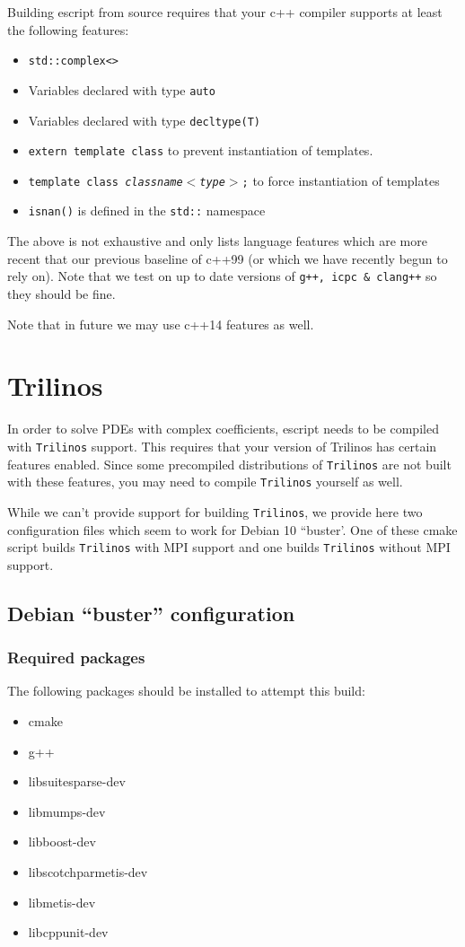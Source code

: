 \documentclass{esysdoc}
\begin{document}
Building escript from source requires that your c++ compiler supports at least the following features:
\begin{itemize}
 \item \texttt{std::complex<>}
 \item Variables declared with type \texttt{auto}
 \item Variables declared with type \texttt{decltype(T)}
 \item \texttt{extern template class} to prevent instantiation of templates.
 \item \texttt{template class \textit{classname$<$type$>$};} to force instantiation of templates
 \item \texttt{isnan()} is defined in the \texttt{std::} namespace
\end{itemize}
The above is not exhaustive and only lists language features which are more recent that our previous baseline of c++99 (or which
we have recently begun to rely on).
Note that we test on up to date versions of \texttt{g++, icpc \& clang++} so they should be fine.

Note that in future we may use c++14 features as well.

\chapter{Trilinos}
\label{app:trilinos}

In order to solve PDEs with complex coefficients, escript needs to be compiled with \texttt{Trilinos} support.
This requires that your version of Trilinos has certain features enabled.
Since some precompiled distributions of \texttt{Trilinos} are not built with these features, you may
need to compile \texttt{Trilinos} yourself as well.

While we can't provide support for building \texttt{Trilinos}, we provide here two configuration files which seem to work for
Debian 10 ``buster'. One of these cmake script builds \texttt{Trilinos} with MPI support and one builds \texttt{Trilinos} without MPI support.

\section{Debian ``buster'' configuration}


\subsection{Required packages}

The following packages should be installed to attempt this build:
\begin{itemize}
\item[] cmake
\item[] g++
\item[] libsuitesparse-dev
\item[] libmumps-dev
\item[] libboost-dev
\item[] libscotchparmetis-dev
\item[] libmetis-dev
\item[] libcppunit-dev
\end{itemize}
\end{document}
